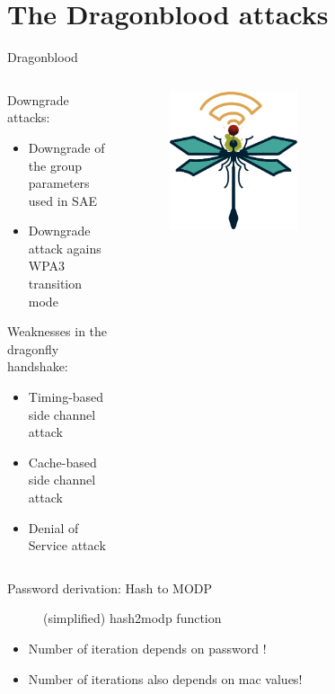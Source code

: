 \documentclass[xcolor=table]{bredelebeamer}
\begin{document}
\section{The Dragonblood attacks}
\begin{frame}{Dragonblood}

\begin{columns}
\begin{column}{0.6\textwidth}  %
Downgrade attacks:
\begin{itemize}
    \item Downgrade of the group parameters used in SAE
    \item Downgrade attack agains WPA3 transition mode
\end{itemize}
Weaknesses in the dragonfly handshake:
\begin{itemize}
    \item Timing-based side channel attack
    \item Cache-based side channel attack
    \item Denial of Service attack
\end{itemize}
\end{column}
\begin{column}{0.4\textwidth}
    \begin{figure}
        \centering
        \includegraphics[width=0.5\textwidth]{dragonblood.png}
        \label{fig:my_label}
    \end{figure}
\end{column}
\end{columns}
    
\end{frame}
\begin{frame}{Password derivation: Hash to MODP}
\begin{figure}
    \centering
    \exampleCode
    \caption{(simplified) hash2modp function}
    \label{fig:my_label}
\end{figure}
\begin{itemize}
    \pause
    \item Number of iteration depends on password !
    \pause 
    \item Number of iterations also depends on mac values!
\end{itemize}
\end{frame}
\end{document}
